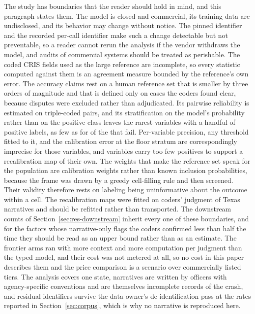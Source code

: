\limitationsparagraph The study has boundaries that the reader should hold in mind, and this
paragraph states them. The model is closed and commercial, its training data are undisclosed, and its
behavior may change without notice. The pinned identifier and the recorded per-call
identifier make such a change detectable but not preventable, so a reader cannot rerun the
analysis if the vendor withdraws the model, and audits of commercial systems should be
treated as perishable. The coded CRIS fields used as the large reference are incomplete, so
every statistic computed against them is an agreement measure bounded by the reference's own
error. The accuracy claims rest on a human reference set that is smaller by three orders of
magnitude and that is defined only on cases the coders found clear, because disputes were
excluded rather than adjudicated. Its pairwise reliability is estimated on \CoderNCalib{}
triple-coded pairs, and its stratification on the model's probability rather than on the
positive class leaves the rarest variables with a handful of positive labels, as few as
\ThreshWeakNPosMin{} for \ThreshWeakNThin{} of the \GoldNWeak{} that fail. Per-variable
precision, any threshold fitted to it, and the calibration error at the floor stratum are
correspondingly imprecise for those variables, and \RecalPooledOnlyN{} variables carry too few
positives to support a recalibration map of their own. The weights that make the reference set
speak for the population are calibration weights rather than known inclusion probabilities,
because the frame was drawn by a greedy cell-filling rule and then screened. Their validity
therefore rests on labeling being uninformative about the outcome within a cell. The recalibration maps
were fitted on \CoderN{} coders' judgment of Texas narratives and should be refitted rather
than transported. The downstream counts of Section~\ref{sec:res-downstream} inherit every one
of these boundaries, and for the \DownNConfirmLow{} factors whose narrative-only flags the
coders confirmed less than half the time they should be read as an upper bound rather than as
an estimate. The frontier arms ran with more context and more computation per judgment than the
typed model, and their cost was not metered at all, so no cost in this paper describes them and
the price comparison is a scenario over commercially listed tiers. The analysis covers one state, narratives are written by officers
with agency-specific conventions and are themselves incomplete records of the crash, and
residual identifiers survive the data owner's de-identification pass at the rates reported in
Section~\ref{sec:corpus}, which is why no narrative is reproduced here.

